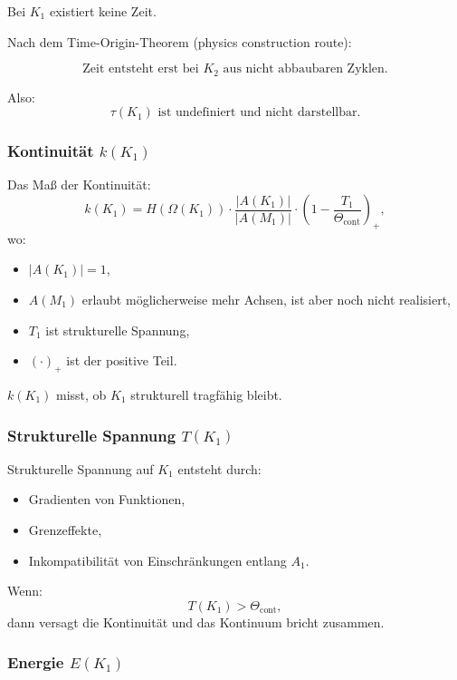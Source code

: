Bei $K_1$ existiert keine Zeit.

Nach dem Time-Origin-Theorem (physics construction route):

\[
\text{Zeit entsteht erst bei } K_2 \text{ aus nicht abbaubaren Zyklen}.
\]

Also:
\[
\tau(K_1) \text{ ist undefiniert und nicht darstellbar.}
\]

\subsubsection{Kontinuität \texorpdfstring{$k(K_1)$}{k(K_1)}}

Das Maß der Kontinuität:
\[
k(K_1) =
H(\Omega(K_1)) \cdot
\frac{|A(K_1)|}{|A(M_1)|} \cdot
(1 - \frac{T_1}{\Theta_{\mathrm{cont}}})_+,
\]
wo:
\begin{itemize}
    \item $|A(K_1)| = 1$,
    \item $A(M_1)$ erlaubt möglicherweise mehr Achsen, ist aber noch nicht realisiert,
    \item $T_1$ ist strukturelle Spannung,
    \item $(\cdot)_+$ ist der positive Teil.
\end{itemize}

$k(K_1)$ misst, ob $K_1$ strukturell tragfähig bleibt.

\subsubsection{Strukturelle Spannung \texorpdfstring{$T(K_1)$}{T(K_1)}}

Strukturelle Spannung auf $K_1$ entsteht durch:
\begin{itemize}
    \item Gradienten von Funktionen,
    \item Grenzeffekte,
    \item Inkompatibilität von Einschränkungen entlang $A_1$.
\end{itemize}

Wenn:
\[
T(K_1) > \Theta_{\mathrm{cont}},
\]
dann versagt die Kontinuität und das Kontinuum bricht zusammen.

\subsubsection{Energie \texorpdfstring{$E(K_1)$}{E(K_1)}}


